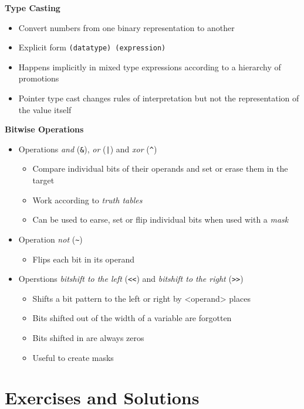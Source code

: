{\begin{defbox}
\textbf{Type Casting}
\begin{itemize}
\item Convert numbers from one binary representation to another
\item Explicit form \texttt{(datatype) (expression)}
\item Happens implicitly in mixed type expressions according to a hierarchy of promotions
\item Pointer type cast changes rules of interpretation but not the representation of the value itself
\end{itemize}
\end{defbox}
%
\begin{defbox}[]
\textbf{Bitwise Operations}
\begin{itemize}
\item Operations \emph{and} (\texttt{\&}), \emph{or} (\texttt{|}) and \emph{xor} (\texttt{\textasciicircum})
	\begin{itemize}
	\item Compare individual bits of their operands and set or erase them in the target
	\item Work according to \emph{truth tables}
	\item Can be used to earse, set or flip individual bits when used with a \emph{mask}
	\end{itemize}
\item Operation \emph{not} (\texttt{\textasciitilde})
	\begin{itemize}
	\item Flips each bit in its operand
	\end{itemize}
\item Operstions \emph{bitshift to the left} (\texttt{<{}<}) and \emph{bitshift to the right} (\texttt{>{}>})
	\begin{itemize}
	\item Shifts a bit pattern to the left or right by <operand> places
	\item Bits shifted out of the width of a variable are forgotten
	\item Bits shifted in are always zeros
	\item Useful to create masks
	\end{itemize}
\end{itemize}
\end{defbox}


\newpage
\section{Exercises and Solutions}
}
